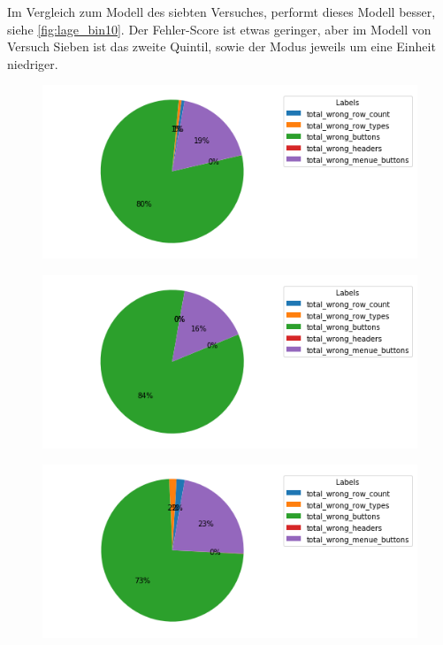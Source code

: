 \documentclass[pdftex,a4paper,halfparskip, article]{scrartcl}
\begin{document}
Im Vergleich zum Modell des siebten Versuches, performt dieses Modell besser, siehe \ref{fig:lage_bin10}. Der Fehler-Score ist etwas geringer, aber im Modell von Versuch Sieben ist das zweite Quintil, sowie der Modus jeweils um eine Einheit niedriger. 

\begin{figure}
\centering
\begin{minipage}{.5\textwidth}
  \centering
  \includegraphics[width=1\linewidth]{predictions_bin15_total_error_types_pie_chart}
  \label{fig:fehler_gesamt_bin15}
\end{minipage}%
\begin{minipage}{.5\textwidth}
  \centering
  \includegraphics[width=1\linewidth]{predictions_bin15_excluded_p80_error_types_pie_chart}
  \label{fig:fehler_beste80_bin15}
\end{minipage}
\begin{minipage}{.5\textwidth}
  \centering
   \includegraphics[width=1\linewidth]{predictions_bin15_p80_error_types_pie_chart}
  \label{fig:fehler_schlechteste20_bin15}
\end{minipage}
\end{figure}
\end{document}
